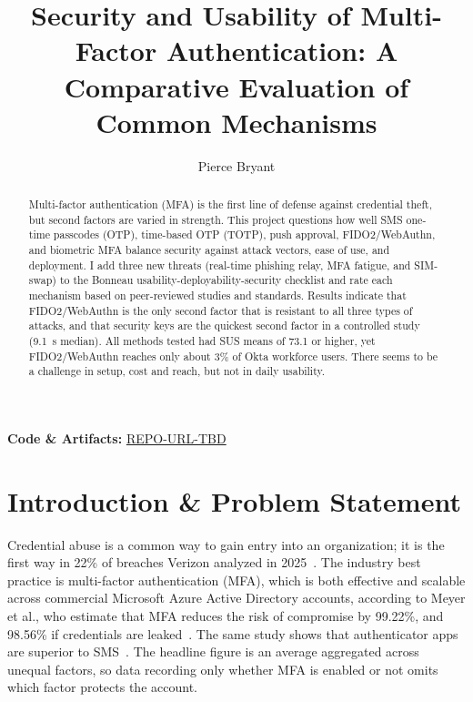 \documentclass[sigconf]{acmart}
\begin{document}
\title{Security and Usability of Multi-Factor Authentication: A Comparative Evaluation of Common Mechanisms}

\author{Pierce Bryant}

\renewcommand{\shortauthors}{Bryant}

\begin{abstract}
  Multi-factor authentication (MFA) is the first line of defense against
  credential theft, but second factors are varied in strength. This
  project questions how well SMS one-time passcodes (OTP), time-based
  OTP (TOTP), push approval, FIDO2/WebAuthn, and biometric MFA balance
  security against attack vectors, ease of use, and deployment. I add three
  new threats (real-time phishing relay, MFA fatigue, and SIM-swap) to the
  Bonneau usability-deployability-security checklist and rate each
  mechanism based on peer-reviewed studies and standards. Results indicate that FIDO2/WebAuthn is the only second factor that is
  resistant to all three types of attacks, and that security keys are the
  quickest second factor in a controlled study (9.1~s median). All methods
  tested had SUS means of 73.1 or higher, yet FIDO2/WebAuthn
  reaches only about 3\% of Okta workforce users. There seems to be a challenge
  in setup, cost and reach, but not in daily usability.
\end{abstract}

\maketitle

\noindent\textbf{Code \& Artifacts:} \url{REPO-URL-TBD}

\section{Introduction \& Problem Statement}

Credential abuse is a common way to gain entry into an organization; it
is the first way in 22\% of breaches Verizon analyzed in
2025~\cite{verizon:2025:dbir}. The industry best practice is multi-factor
authentication (MFA), which is both effective and scalable across
commercial Microsoft Azure Active Directory accounts, according to Meyer et al., who
estimate that MFA reduces the risk of compromise by 99.22\%, and 98.56\%
if credentials are leaked~\cite{meyer:2023:mfa}. The same study
shows that authenticator apps are superior to SMS~\cite{meyer:2023:mfa}.
The headline figure is an average aggregated across unequal factors, so
data recording only whether MFA is enabled or not omits which factor
protects the account.
\end{document}
